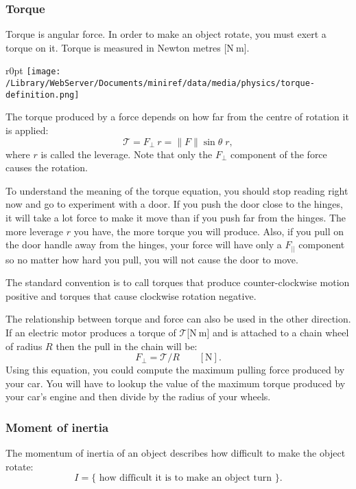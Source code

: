 \documentclass[letterpaper,9pt,journal]{IEEEtran}
\begin{document}
\vspace{-3mm}
\subsubsection{Torque}

Torque is angular force. 
In order to make an object rotate, you must exert a torque on it.
Torque is measured in Newton metres [N$\:$m]. 

\begin{wrapfigure}{r}{0pt}
\texttt{[image: /Library/WebServer/Documents/miniref/data/media/physics/torque-definition.png]}
\end{wrapfigure}

The torque produced by a force depends on how far from the centre of rotation it is applied:
\[
 \mathcal{T} = F_{\!\perp}\: r = \|F\|\sin\theta\; r,
\]
where $r$ is called the leverage.  
Note that only the $F_{\perp}$ component of the force causes the rotation. 

To understand the meaning of the torque equation, you should stop reading right now
and go to experiment with a door. 
If you push the door close to the hinges, it will take a lot force to make it move
than if you push far from the hinges. The more leverage $r$ you have,
the more torque you will produce. 
Also, if you pull on the door handle away from the hinges,
your force will have only a $F_{||}$ component so no matter how hard 
you pull, you will not cause the door to move.

The standard convention is to call torques that produce counter-clockwise 
motion positive and torques that cause clockwise rotation negative.


The relationship between torque and force can also be used in the other direction.
If an electric motor produces a torque of $\mathcal{T}$[N$\:$m] and is attached to
a chain wheel of radius $R$ then the pull in the chain will be:
\[
  F_{\perp} = \mathcal{T}/R \qquad [\text{N}].
\]
Using this equation, you could compute the maximum pulling force produced by your car.
You will have to lookup the value of the maximum torque produced by your car's 
engine and then divide by the radius of your wheels.


\subsubsection{Moment of inertia}

The momentum of inertia of an object describes how difficult to make the object rotate:
\[
  I = \{ \text{ how difficult it is to make an object turn } \}.
\]
\end{document}
